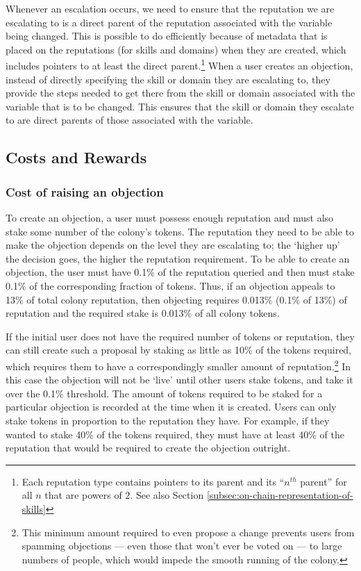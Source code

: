 Whenever an escalation occurs, we need to ensure that the reputation we are escalating to is a direct parent of the reputation associated with the variable being changed. This is possible to do efficiently because of metadata that is placed on the reputations (for skills and domains) when they are created, which includes pointers to at least the direct parent.\footnote{Each reputation type contains pointers to its parent  and its ``$n^{th}$ parent''  for all $n$ that are powers of $2$. See also Section \ref{subsec:on-chain-representation-of-skills}} When a user creates an objection, instead of directly specifying the skill or domain they are escalating to, they provide the steps needed to get there from the skill or domain associated with the variable that is to be changed. This ensures that the skill or domain they escalate to are direct parents of those associated with the variable.

\subsection{Costs and Rewards}\label{sec:costs-of-disputes}
\subsubsection{Cost of raising an objection}
To create an objection, a user must possess enough reputation and must also stake some number of the colony's tokens. The reputation they need to be able to make the objection depends on the level they are escalating to; the `higher up' the decision goes, the higher the reputation requirement. To be able to create an objection, the user must have 0.1\% of the reputation queried and then must stake 0.1\% of the corresponding fraction of tokens. Thus, if an objection appeals to 13\% of total colony reputation, then objecting requires 0.013\% (0.1\% of 13\%) of reputation and the required stake is 0.013\% of all colony tokens.

If the initial user does not have the required number of tokens or reputation, they can still create such a proposal by staking as little as 10\% of the tokens required, which requires them to have a correspondingly smaller amount of reputation.\footnote{This minimum amount required to even propose a change prevents users from spamming objections --- even those that won’t ever be voted on --- to large numbers of people, which would impede the smooth running of the colony.} In this case the objection will not be `live' until other users stake tokens, and take it over the 0.1\% threshold. The  amount of tokens required to be staked for a particular objection is recorded at the time when it is created. Users can only stake tokens in proportion to the reputation they have. For example, if they wanted to stake 40\% of the tokens required, they must have at least 40\% of the reputation that would be required to create the objection outright.

